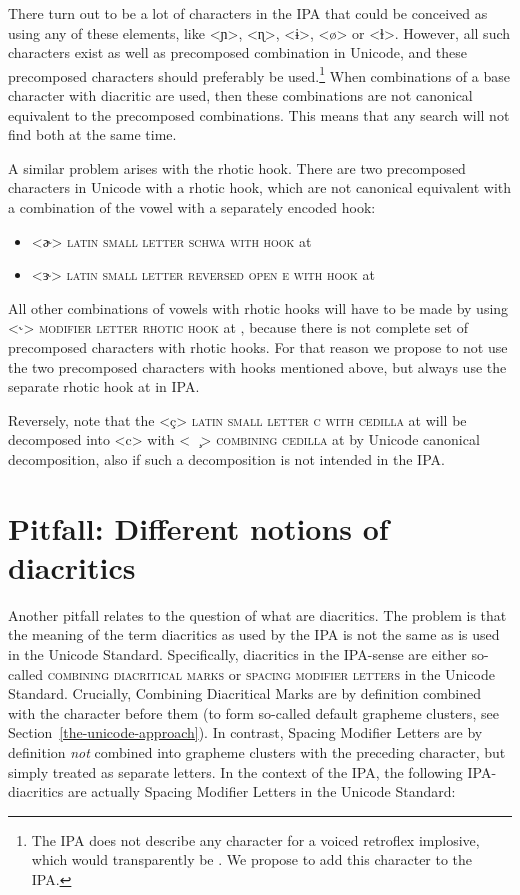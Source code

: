 There turn out to be a lot of characters in the IPA that could be conceived as
using any of these elements, like <ɲ>, <ɳ>, <ɨ>, <ø> or <ɫ>. However, all such
characters exist as well as precomposed combination in Unicode, and these
precomposed characters should preferably be used.\footnote{The IPA does not
describe any character for a voiced retroflex implosive, which would
transparently be . We propose to add this character to the IPA.} When
combinations of a base character with diacritic are used, then these
combinations are not canonical equivalent to the precomposed combinations. This
means that any search will not find both at the same time.

A similar problem arises with the rhotic hook. There are two precomposed
characters in Unicode with a rhotic hook, which are not canonical equivalent 
with a combination of the vowel with a separately encoded hook:
\begin{itemize}
  \item[] <ɚ> \textsc{latin small letter schwa with hook} at 
  \item[] <ɝ> \textsc{latin small letter reversed open e with hook} at 
\end{itemize}
          
All other combinations of vowels with rhotic hooks will have to be made by using
<{\large ˞}> \textsc{modifier letter rhotic hook} at , because there
is not complete set of precomposed characters with rhotic hooks. For that reason
we propose to not use the two precomposed characters with hooks mentioned above,
but always use the separate rhotic hook at  in IPA.\@

Reversely, note that the <ç> \textsc{latin small letter c with cedilla} at
 will be decomposed into <c> with <\ \ {\large ̧}> \textsc{combining
cedilla} at  by Unicode canonical decomposition, also if such a
decomposition is not intended in the IPA.\@

\section{Pitfall: Different notions of diacritics}
\label{pitfall-different-notions-of-diacritics}

Another pitfall relates to the question of what are diacritics. The problem is that
the meaning of the term diacritics as used by the IPA is not the same as is used
in the Unicode Standard. Specifically, diacritics in the IPA-sense are either
so-called \textsc{combining diacritical marks} or \textsc{spacing modifier
letters} in the Unicode Standard. Crucially, Combining Diacritical Marks are by
definition combined with the character before them (to form so-called default
grapheme clusters, see Section~\ref{the-unicode-approach}). In contrast, Spacing
Modifier Letters are by definition \emph{not} combined into grapheme clusters
with the preceding character, but simply treated as separate letters. In the
context of the IPA, the following IPA-diacritics are actually Spacing Modifier
Letters in the Unicode Standard:

